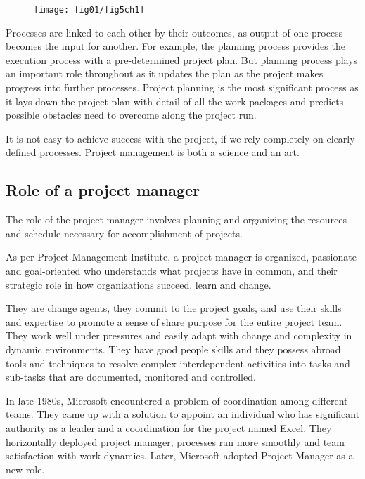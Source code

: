  \begin{figure}
 	\centering
 	\texttt{[image: fig01/fig5ch1]}
 \end{figure}
 Processes are linked to each other by their outcomes, as output of one process becomes the input for another. For example, the planning process provides the execution process with a pre-determined project plan. But planning process plays an important role throughout as it updates the plan as the project makes progress into further processes. Project planning is the most significant process as it lays down the project plan with detail of all the work packages and predicts possible obstacles need to overcome along the project run.

It is not easy to achieve success with the project, if we rely completely on clearly defined processes. Project management is both a science and an art.

\subsection{Role of a project manager}
\label{subsec:subsec02}

The role of the project manager involves planning and organizing the resources and schedule necessary for accomplishment of projects.

As per Project Management Institute, a project manager \cite{pmanager} is organized, passionate and goal-oriented who understands what projects have in common, and their strategic role in how organizations succeed, learn and change.

They are change agents, they commit to the project goals, and use their skills and expertise to promote a sense of share purpose for the entire project team.
They work well under pressures and easily adapt with change and complexity in dynamic environments. They have good people skills and they possess abroad tools and techniques to resolve complex interdependent activities into tasks and sub-tasks that are documented, monitored and controlled.

In late 1980s, Microsoft encountered a problem of coordination among different teams. They came up with a solution to appoint an individual who has significant authority as a leader and a coordination for the project named Excel. They horizontally deployed project manager, processes ran more smoothly and team satisfaction with work dynamics. Later, Microsoft adopted Project Manager as a new role.

